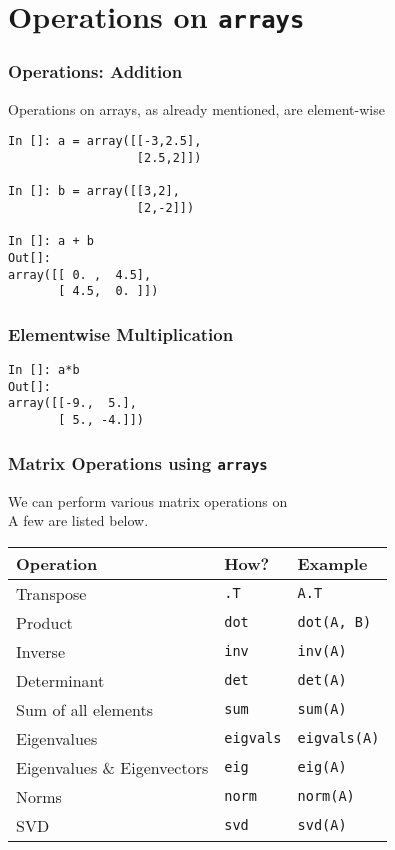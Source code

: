 \documentclass[14pt,compress]{beamer}
\newcommand{\typ}[1]{\lstinline{#1}}
\newcommand{\kwrd}[1]{ \texttt{\textbf{\color{blue}{#1}}}  }
\begin{document}
\section{Operations on \typ{arrays}}
\begin{frame}[fragile]
  \frametitle{Operations: Addition}
  Operations on arrays, as already mentioned, are \alert{element-wise}
  \begin{lstlisting}
In []: a = array([[-3,2.5],
                  [2.5,2]])

In []: b = array([[3,2],
                  [2,-2]])

In []: a + b
Out[]: 
array([[ 0. ,  4.5],
       [ 4.5,  0. ]])
  \end{lstlisting}
\end{frame}

\begin{frame}[fragile]
\frametitle{Elementwise Multiplication}
\begin{lstlisting}
In []: a*b
Out[]: 
array([[-9.,  5.],
       [ 5., -4.]])
\end{lstlisting}
\end{frame}

\begin{frame}[fragile]
\frametitle{Matrix Operations using \typ{arrays}}

We can perform various matrix operations on \kwrd{arrays}\\ 
A few are listed below.

\vspace{-0.2in}

\begin{center}
\begin{tabular}{lll}
 Operation                    &  How?           &  Example           \\
\hline
 Transpose                    &  \typ{.T}       &  \typ{A.T}         \\
 Product                      &  \typ{dot}      &  \typ{dot(A, B)}   \\
 Inverse                      &  \typ{inv}      &  \typ{inv(A)}      \\
 Determinant                  &  \typ{det}      &  \typ{det(A)}      \\
 Sum of all elements          &  \typ{sum}      &  \typ{sum(A)}      \\
 Eigenvalues                  &  \typ{eigvals}  &  \typ{eigvals(A)}  \\
 Eigenvalues \& Eigenvectors  &  \typ{eig}      &  \typ{eig(A)}      \\
 Norms                        &  \typ{norm}     &  \typ{norm(A)}     \\
 SVD                          &  \typ{svd}      &  \typ{svd(A)}      \\
\end{tabular}
\end{center}

\end{frame}
\end{document}
